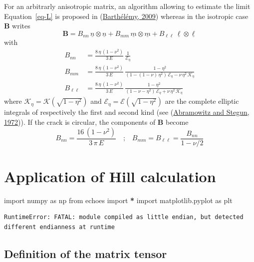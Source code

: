 \documentclass[
  letterpaper,
  DIV=11,
  numbers=noendperiod]{scrreprt}
\newenvironment{Shaded}{\begin{snugshade}}{\end{snugshade}}
\newcommand{\ImportTok}[1]{#1}
\newcommand{\NormalTok}[1]{#1}
\newcommand{\OperatorTok}[1]{\textcolor[rgb]{0.81,0.36,0.00}{\textbf{#1}}}
\begin{document}
For an arbitrarly anisotropic matrix, an algorithm allowing to estimate
the limit Equation~\ref{eq-L} is proposed in
(\protect\hyperlink{ref-barthelemy2009c}{Barthélémy, 2009}) whereas in
the isotropic case \({\mathbf{\boldsymbol{{B}}}}\) writes \[
{\mathbf{\boldsymbol{{B}}}}=
B_{nn}\,{\underline{{n}}}\otimes{\underline{{n}}}
+
B_{mm}\,{\underline{{m}}}\otimes{\underline{{m}}}
+
B_{\ell\ell}\,{\underline{{\ell}}}\otimes{\underline{{\ell}}}
\] with \[\begin{aligned}
B_{nn}&=\frac{8\,\eta\,(1-\nu^2)}{3\,E}\,
\frac{1}{\mathcal{E}_\eta}\label{eq:Bnn}\\
B_{mm}&=\frac{8\,\eta\,(1-\nu^2)}{3\,E}\,
\frac{1-\eta^2}{\left(1-(1-\nu)\,\eta^2\right)
\,\mathcal{E}_\eta-\nu\,\eta^2\,\mathcal{K}_\eta}\\
B_{\ell\ell}&=\frac{8\,\eta\,(1-\nu^2)}{3\,E}\,
\frac{1-\eta^2}{(1-\nu-\eta^2)\,\mathcal{E}_\eta+\nu\,\eta^2\,\mathcal{K}_\eta}
\end{aligned}\] where \(\mathcal{K}_\eta=\mathcal{K}(\sqrt{1-\eta^2})\)
and \(\mathcal{E}_\eta=\mathcal{E}(\sqrt{1-\eta^2})\) are the complete
elliptic integrals of respectively the first and second kind (see
(\protect\hyperlink{ref-abramowitz1972}{Abramowitz and Stegun, 1972})).
If the crack is circular, the components of
\({\mathbf{\boldsymbol{{B}}}}\) become \[
B_{nn}=\frac{16\,(1-\nu^2)}{3\,\pi\,E}
\quad\textrm{;}\quad
B_{mm}=B_{\ell\ell}=\frac{B_{nn}}{1-\nu/2}
\]

\hypertarget{application-of-hill-calculation}{%
\section{Application of Hill
calculation}\label{application-of-hill-calculation}}

\begin{Shaded}
\begin{Highlighting}[]
\ImportTok{import}\NormalTok{ numpy }\ImportTok{as}\NormalTok{ np}
\ImportTok{from}\NormalTok{ echoes }\ImportTok{import} \OperatorTok{*}
\ImportTok{import}\NormalTok{ matplotlib.pyplot }\ImportTok{as}\NormalTok{ plt}
\end{Highlighting}
\end{Shaded}

\begin{verbatim}
RuntimeError: FATAL: module compiled as little endian, but detected different endianness at runtime
\end{verbatim}

\hypertarget{definition-of-the-matrix-tensor}{%
\subsection{Definition of the matrix
tensor}\label{definition-of-the-matrix-tensor}}
\end{document}
